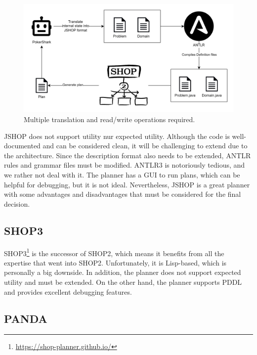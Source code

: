 \begin{figure}[h]
    \centering
    \includegraphics[width=\textwidth]{graphics/jshop.png}
    \caption{Multiple translation and read/write operations required.}
    \label{fig:jshop}
\end{figure}



JSHOP does not support utility nur expected utility. Although the code is well-documented and can be considered clean, it will be challenging to extend due to the architecture. Since the description format also needs to be extended, ANTLR rules and grammar files must be modified. ANTLR3 is notoriously tedious, and we rather not deal with it. The planner has a GUI to run plans, which can be helpful for debugging, but it is not ideal. Nevertheless, JSHOP is a great planner with some advantages and disadvantages that must be considered for the final decision.





\subsection*{SHOP3}
SHOP3\footnote{\url{https://shop-planner.github.io/}} is the successor of SHOP2, which means it benefits from all the expertise that went into SHOP2. Unfortunately, it is Lisp-based, which is personally a big downside. In addition, the planner does not support expected utility and must be extended. On the other hand, the planner supports PDDL and provides excellent debugging features.



\subsection*{PANDA}

